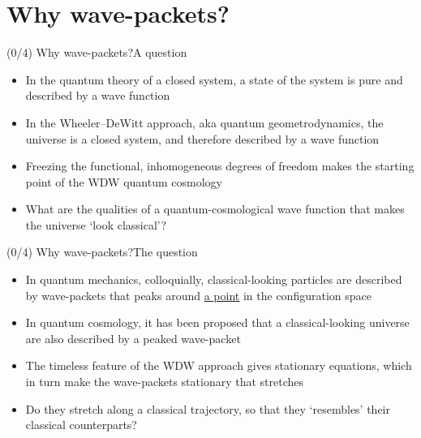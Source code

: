 \documentclass[mathserif]{beamer}
\begin{document}
\section{Why wave-packets?}


\begin{frame}{(0/4) Why wave-packets?}{A question}
    \begin{itemize}
        \item In the quantum theory of a closed system, a state of the system
            is pure and described by a wave function
        \item In the Wheeler--DeWitt approach, aka quantum geometrodynamics, the
            universe is a closed system, and therefore described by a wave
            function
        \item Freezing the functional, inhomogeneous degrees
            of freedom makes the starting point of the WDW quantum cosmology
    \end{itemize}

    \begin{itemize}
        \item What are the qualities of a quantum-cosmological wave function 
            that makes the universe `look classical'?
    \end{itemize}
\end{frame}

\begin{frame}{(0/4) Why wave-packets?}{The question}
    \begin{itemize}
        \item
        In quantum mechanics, colloquially, classical-looking particles
        are described by wave-packets that peaks around \underline{a point} in 
        the configuration space
        \item
        In quantum cosmology, it has been proposed that a classical-looking 
        universe are also described by a \alert{peaked} wave-packet
        \item
        The timeless feature of the WDW approach gives stationary equations,
        which in turn make the wave-packets stationary that \alert{stretches}
    \end{itemize}

    \begin{itemize}
        \item
        Do they stretch along a classical trajectory, so that they `resembles'
        their classical counterparts?
    \end{itemize}
\end{frame}
\end{document}
